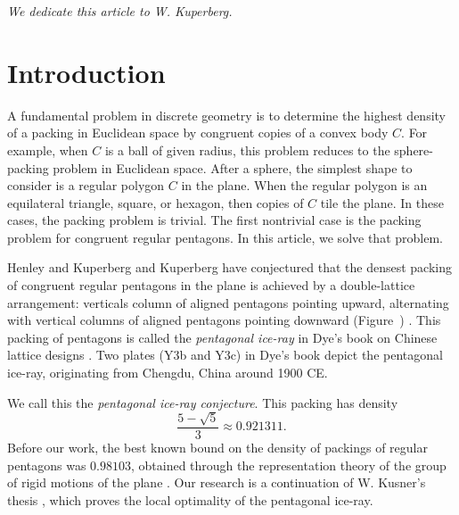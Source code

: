 \def\threepentnoD#1#2#3#4#5#6#7#8#9{%
\pen{#1}{#2}{#3};
\pen{#4}{#5}{#6};
\pen{#7}{#8}{#9}
}

\def\blankfig#1{\tikzfig{#1}{Insert graphic}
{
[scale=1]
\draw(0,) circle(1cm);
}}



\centerline{\it We dedicate this article to W. Kuperberg.}

\section{Introduction} %

A fundamental problem in discrete geometry is to determine the highest
density of a packing in Euclidean space by congruent copies of a
convex body $C$.  For example, when $C$ is a ball of given radius,
this problem reduces to the sphere-packing problem in Euclidean space.
After a sphere, the simplest shape to consider is a regular polygon
$C$ in the plane.  When the regular polygon is an equilateral
triangle, square, or hexagon, then copies of $C$ tile the plane.  In
these cases, the packing problem is trivial.  The first nontrivial
case is the packing problem for congruent regular pentagons.  In this
article, we solve that problem.

Henley and Kuperberg and Kuperberg have conjectured that the densest
packing of congruent regular pentagons in the plane is achieved by a
double-lattice arrangement: verticals column of aligned pentagons
pointing upward, alternating with vertical columns of aligned
pentagons pointing downward (Figure~)
\cite{Kup} \cite[p.801]{henley}.  This packing of pentagons is called
the {\it pentagonal ice-ray} in Dye's book on Chinese lattice designs
\cite{dye}.  Two plates (Y3b and Y3c) in Dye's book depict the
pentagonal ice-ray, originating from Chengdu, China around 1900 CE.

 We call this the {\it pentagonal ice-ray  conjecture}.
This packing has density
\[
\frac{5 - \sqrt{5}}3 \approx 0.921311.
\] %
Before our work, the best known bound on the density of packings of
regular pentagons was $0.98103$, obtained through the representation
theory of the group of rigid motions of the plane \cite{Val}.  Our
research is a continuation of W. Kusner's thesis \cite{Kus}, which
proves the local optimality of the pentagonal ice-ray.


